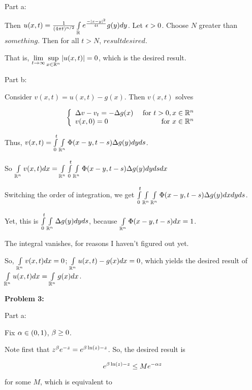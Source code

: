 \documentclass[a4paper,12pt]{article}
\begin{document}
Part a:

Then $u(x,t) = \frac{1}{(4\pi t)^{n/2}}\int\limits_{\mathbb{R}} e^{\frac{-\left\lvert x-y \right\rvert^2}{4t}} g(y) dy$. Let $\epsilon >0$. Choose $N$ greater than $something$. Then for all $t >N$, $result desired$.

That is, $\lim\limits_{t \to \infty} \sup\limits_{x \in \mathbb{R}^n} \left\lvert u(x,t) \right\rvert = 0$, which is the desired result.

\shunt

Part b:

Consider $v(x,t) = u(x,t) - g(x)$. Then $v(x,t)$ solves

\begin{displaymath}
   \left\{
     \begin{array}{lr}
       \Delta v -v_t  = -\Delta g(x) & \text{ for } t>0, x \in \mathbb{R}^n \\
       v(x,0) = 0 & \text{ for } x \in \mathbb{R}^n
     \end{array}
   \right.
\end{displaymath}

Thus, $v(x,t) = \int\limits_0^t \int\limits_{\mathbb{R}^n} \Phi(x-y,t-s) \Delta g(y) dy ds$.

So $\int\limits_{\mathbb{R}^n} v(x,t) dx = \int\limits_{\mathbb{R}^n} \int\limits_0^t \int\limits_{\mathbb{R}^n} \Phi(x-y,t-s) \Delta g(y) dy ds dx$

Switching the order of integration, we get $ \int\limits_0^t \int\limits_{\mathbb{R}^n} \int\limits_{\mathbb{R}^n} \Phi(x-y,t-s) \Delta g(y) dx dy ds$.

Yet, this is $ \int\limits_0^t \int\limits_{\mathbb{R}^n} \Delta g(y) dy ds$, because $\int\limits_{\mathbb{R}^n} \Phi(x-y,t-s) dx = 1$. 

The integral vanishes, for reasons I haven't figured out yet. %

So, $\int\limits_{\mathbb{R}^n} v(x,t) dx = 0$; $\int\limits_{\mathbb{R}^n} u(x,t) - g(x) dx = 0$, which yields the desired result of $\int\limits_{\mathbb{R}^n} u(x,t) dx = \int\limits_{\mathbb{R}^n} g(x) dx$.

\shunt

{\bf Problem 3:}

Part a: %

Fix $\alpha \in (0,1)$, $\beta \geq 0$.

Note first that $z^\beta e^{-z} = e^{\beta \ln(z) - z}$. So, the desired result is

\begin{displaymath}
e^{\beta \ln(z) - z} \leq M e^{-\alpha z}
\end{displaymath}

for some $M$, which is equivalent to
\end{document}
